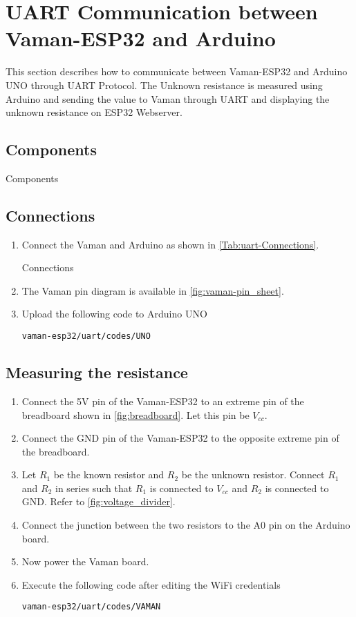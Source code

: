 \section{UART Communication between Vaman-ESP32 and Arduino}
This section describes how to communicate between Vaman-ESP32 and Arduino UNO 
through UART Protocol. The Unknown resistance is measured using Arduino and 
sending the value to Vaman through UART and displaying the unknown resistance on
ESP32 Webserver.
\subsection{Components}
\begin{table}[!ht]
\centering

\caption{Components}
\label{table:uart-components}
\end{table}

\subsection{Connections}
\begin{enumerate}
\item
Connect the Vaman and Arduino as shown in \autoref{Tab:uart-Connections}.

\begin{table}[!ht]
\centering

\caption{Connections}
\label{Tab:uart-Connections}
\end{table}
\item
The Vaman pin diagram is available in \autoref{fig:vaman-pin_sheet}.

\item Upload the following code to Arduino UNO

\begin{lstlisting}
vaman-esp32/uart/codes/UNO
\end{lstlisting}
\end{enumerate}
\subsection{Measuring the resistance}
\begin{enumerate}
\item
Connect the 5V pin of the Vaman-ESP32 to an extreme pin of the breadboard shown
in \autoref{fig:breadboard}. Let this pin be $V_{cc}$.
\item
Connect the GND pin of the Vaman-ESP32 to the opposite extreme pin of the 
breadboard.
\item
Let $R_1$ be the known resistor and $R_2$ be the unknown resistor. Connect $R_1$
and $R_2$ in series such that $R_1$ is connected to $V_{cc}$ and $R_2$ is
connected to GND. Refer to \autoref{fig:voltage_divider}.
\item
Connect the junction between the two resistors to the A0 pin on the Arduino
board.
\item
Now power the Vaman board.
\item
Execute the following code after editing the WiFi credentials
\begin{lstlisting}
vaman-esp32/uart/codes/VAMAN
\end{lstlisting}
\end{enumerate}
